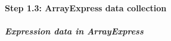 



\paragraph{Step 1.3: ArrayExpress data collection}


%
%

\subparagraph{Expression data in ArrayExpress}

